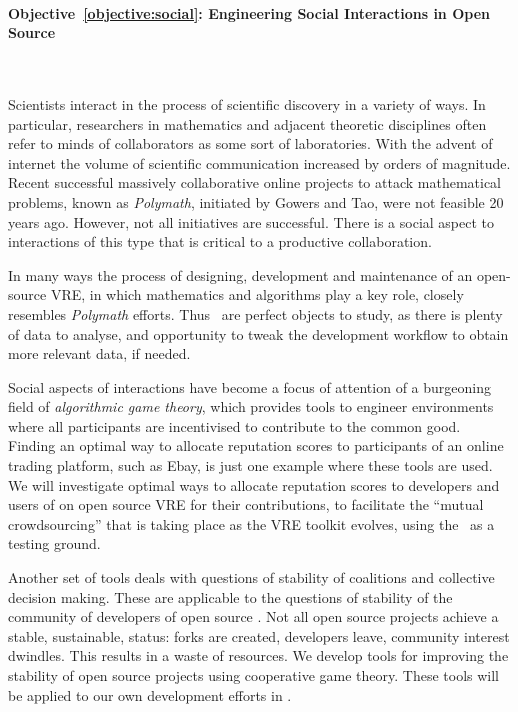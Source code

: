 \documentclass[noworkareas,deliverables,\classoptions]{euproposal}       %
\begin{document}
\begin{proposal}
\paragraph{Objective~\ref{objective:social}: Engineering Social
  Interactions in Open Source \VREs}\

Scientists interact in the process of scientific discovery in a
variety of ways.  In particular, researchers in mathematics and
adjacent theoretic disciplines often refer to minds of collaborators
as some sort of laboratories. With the advent of internet the volume
of scientific communication increased by orders of magnitude. Recent
successful massively collaborative online projects to attack
mathematical problems, known as \emph{Polymath}, initiated by Gowers
and Tao, were not feasible 20 years ago. However, not all initiatives
are successful. There is a social aspect to interactions of this type
that is critical to a productive collaboration.

In many ways the process of designing, development and maintenance of
an open-source VRE, in which mathematics and algorithms play a key
role, closely resembles \emph{Polymath} efforts.  Thus \TheProject\
\VREs are perfect objects to study, as there is plenty of data to
analyse, and opportunity to tweak the development workflow to obtain
more relevant data, if needed.

Social aspects of interactions have become a focus of attention of a
burgeoning field of \emph{algorithmic game theory}, which provides
tools to engineer environments where all participants are incentivised
to contribute to the common good.  Finding an optimal way to allocate
reputation scores to participants of an online trading platform, such
as Ebay, is just one example where these tools are used. We will
investigate optimal ways to allocate reputation scores to developers
and users of on open source VRE for their contributions, to facilitate
the ``mutual crowdsourcing'' that is taking place as the VRE toolkit
evolves, using the \TheProject\ \VREs as a testing ground.

Another set of tools deals with questions of stability of coalitions
and collective decision making.  These are applicable to the questions
of stability of the community of developers of open source \VREs. Not
all open source projects achieve a stable, sustainable, status: forks
are created, developers leave, community interest dwindles. This
results in a waste of resources.  We develop tools for improving the
stability of open source projects using cooperative game theory. These
tools will be applied to our own development efforts in \TheProject
\VREs.



\end{proposal}
\end{document}
